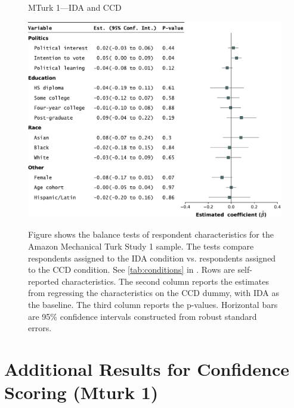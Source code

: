 \begin{center}
	\begin{figure}
		\centering
		\caption{MTurk 1---IDA and CCD}
		\includegraphics[width=\textwidth]{../figs/study1-baltest-24k-ips.pdf}
		\label{fig:baltest-24k-ips}
		\caption*{\footnotesize 
			Figure shows the balance tests of respondent characteristics for the Amazon Mechanical Turk Study 1 sample.
			The tests compare respondents assigned to the IDA condition vs. respondents assigned to the CCD condition.
			See \cref{tab:conditions} in .
			Rows are self-reported characteristics.
			The second column reports the estimates from regressing the characteristics on the CCD dummy, with IDA as the baseline.
			The third column reports the p-values.
			Horizontal bars are 95\% confidence intervals constructed from robust standard errors.
		}
	\end{figure}
\end{center}

\newpage
\section{Additional Results for Confidence Scoring (Mturk 1)}\label{si:mturk1-ccd}

